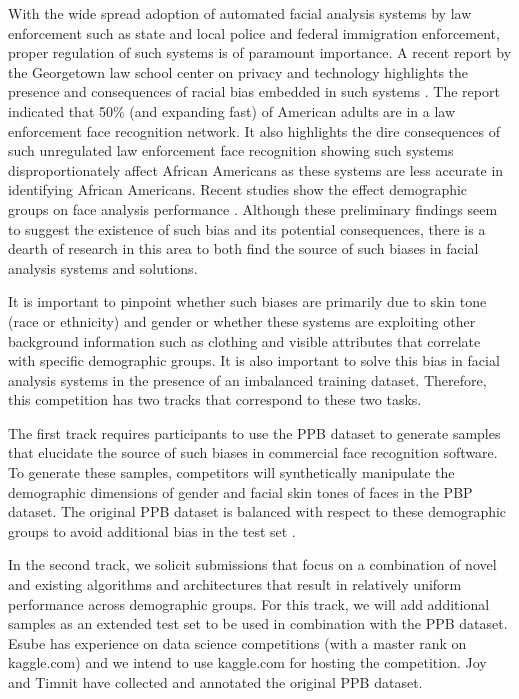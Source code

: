 \documentclass[11pt, oneside]{article}
\makeatletter
\let\@internalcite\cite
\def\cite{\def\citeauthoryear##1##2{##1, ##2}\@internalcite}
\makeatother
\begin{document}
With the wide spread adoption of automated facial analysis systems by law 
enforcement such as state and local police and federal immigration enforcement, 
proper regulation of such systems is of paramount importance. A recent report 
by the Georgetown law school center on privacy and technology highlights the 
presence and consequences of racial bias embedded in such systems 
\cite{garvie2016perpetual}. The report indicated that 50\% (and expanding fast) 
of American adults are in a law enforcement face recognition network. It also 
highlights the dire consequences of such unregulated law enforcement face 
recognition showing such systems disproportionately affect African Americans as 
these systems are less accurate in identifying African Americans. Recent 
studies show the effect demographic groups on face analysis performance 
\cite{han2015demographic} \cite{farinella2012demographic} \cite{klare2012face}. 
Although these preliminary findings seem to suggest the existence of such bias 
and its potential consequences, there is a dearth of research in this area to 
both find the source of such biases in facial analysis systems and solutions.

It is important to pinpoint whether such biases are primarily due to skin tone 
(race or ethnicity) and gender or whether these systems are exploiting other 
background information such as clothing and visible attributes that correlate 
with specific demographic groups. It is also important to solve this bias in 
facial analysis systems in the presence of an imbalanced training dataset. 
Therefore, this competition has two tracks that correspond to these two tasks.

The first track requires participants to use the PPB dataset to generate 
samples that elucidate the source of such biases in commercial face recognition 
software. To generate these samples, competitors will synthetically manipulate 
the demographic dimensions of gender and facial skin tones of faces in the PBP 
dataset. The original PPB dataset is balanced with respect to these 
demographic groups to avoid additional bias in the test set 
\cite{buolamwini2018gender}.

In the second track, we solicit submissions that focus on a combination of 
novel and existing algorithms and architectures that result in relatively 
uniform performance across demographic groups. For this track, we will add 
additional samples as an extended test set to be used in combination with the 
PPB dataset. Esube has experience on data science competitions (with a master 
rank on kaggle.com) and we intend to use kaggle.com for hosting the 
competition. Joy and Timnit have collected and annotated the original PPB 
dataset.
\end{document}
